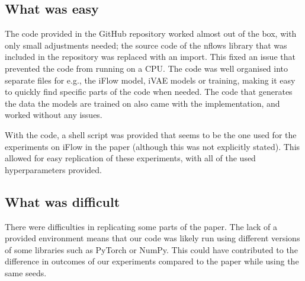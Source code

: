 \subsection{What was easy}
The code provided in the GitHub repository worked almost out of the box, with only small adjustments needed; the source code of the nflows library that was included in the repository was replaced with an import. This fixed an issue that prevented the code from running on a CPU.
The code was well organised into separate files for e.g., the iFlow model, iVAE models or training, making it easy to quickly find specific parts of the code when needed. The code that generates the data the models are trained on also came with the implementation, and worked without any issues.

With the code, a shell script was provided that seems to be the one used for the experiments on iFlow in the paper (although this was not explicitly stated). This allowed for easy replication of these experiments, with all of the used hyperparameters provided.

\subsection{What was difficult}

There were difficulties in replicating some parts of the paper. The lack of a provided environment means that our code was likely run using different versions of some libraries such as PyTorch or NumPy. This could have contributed to the difference in outcomes of our experiments compared to the paper while using the same seeds.

